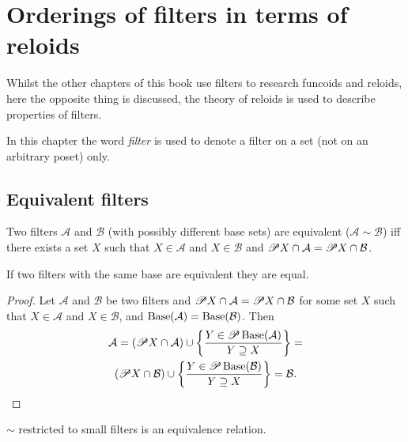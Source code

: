 
\chapter{Orderings of filters in terms of reloids}

Whilst the other chapters of this book use filters to research funcoids
and reloids, here the opposite thing is discussed, the theory of reloids
is used to describe properties of filters.

In this chapter the word \emph{filter} is used to denote a filter
on a set (not on an arbitrary poset) only.


\section{Equivalent filters}
\begin{defn}
Two filters $\mathcal{A}$ and $\mathcal{B}$
(with possibly different base sets) are equivalent ($\mathcal{A}\sim\mathcal{B}$)
iff there exists a set $X$ such that $X\in\mathcal{A}$ and $X\in\mathcal{B}$
and $\mathscr{P} X\cap\mathcal{A}=\mathscr{P} X\cap\mathcal{B}$.\end{defn}
\begin{prop}
If two filters with the same base are equivalent they are equal.\end{prop}
\begin{proof}
Let $\mathcal{A}$ and $\mathcal{B}$ be two filters and $\mathscr{P} X\cap\mathcal{A}=\mathscr{P} X\cap\mathcal{B}$
for some set $X$ such that $X\in\mathcal{A}$ and $X\in\mathcal{B}$,
and $\operatorname{Base}(\mathcal{A})=\operatorname{Base}(\mathcal{B})$. Then
\begin{multline*}
\mathcal{A}=(\mathscr{P} X\cap\mathcal{A})\cup\left\{ \frac{Y\in\mathscr{P}\operatorname{Base}(\mathcal{A})}{Y\supseteq X}\right\}=\\
(\mathscr{P} X\cap\mathcal{B})\cup\left\{ \frac{Y\in\mathscr{P}\operatorname{Base}(\mathcal{B})}{Y\supseteq X}\right\}=\mathcal{B}.
\end{multline*}
\end{proof}
\begin{prop}
$\sim$ restricted to small filters is an equivalence relation.\end{prop}
